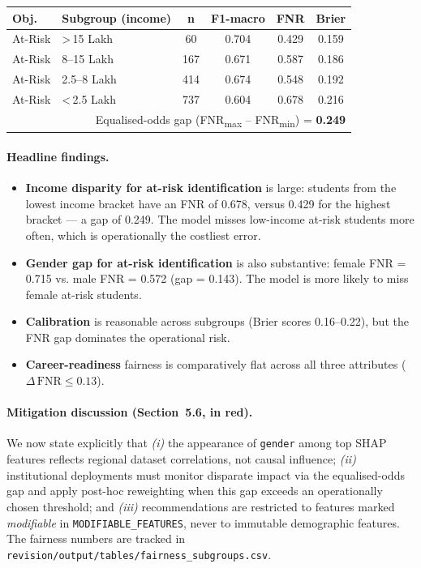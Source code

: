 \documentclass[11pt,a4paper]{article}
\newcommand{\filebox}[1]{\texttt{\small #1}}
\newcommand{\sectref}[1]{Section~#1}
\newcommand{\stress}[1]{\textbf{#1}}
\begin{document}
\begin{itemize}
\begin{center}\small
\begin{tabular}{l l c c c c}
\toprule
\textbf{Obj.} & \textbf{Subgroup (income)} & \textbf{n} & \textbf{F1-macro} & \textbf{FNR} & \textbf{Brier} \\
\midrule
At-Risk & \textgreater{}\,15 Lakh         & 60  & 0.704 & 0.429 & 0.159 \\
At-Risk & 8--15 Lakh                       & 167 & 0.671 & 0.587 & 0.186 \\
At-Risk & 2.5--8 Lakh                      & 414 & 0.674 & 0.548 & 0.192 \\
At-Risk & \textless\,2.5 Lakh              & 737 & 0.604 & 0.678 & 0.216 \\
\midrule
\multicolumn{6}{r}{Equalised-odds gap (FNR\textsubscript{max} -- FNR\textsubscript{min}) = \stress{0.249}} \\
\bottomrule
\end{tabular}
\end{center}

\paragraph{Headline findings.}
\begin{itemize}
  \item \stress{Income disparity for at-risk identification} is large: students from the lowest income bracket have an FNR of 0.678, versus 0.429 for the highest bracket --- a gap of 0.249. The model misses low-income at-risk students more often, which is operationally the costliest error.
  \item \stress{Gender gap for at-risk identification} is also substantive: female FNR = 0.715 vs. male FNR = 0.572 (gap = 0.143). The model is more likely to miss female at-risk students.
  \item \stress{Calibration} is reasonable across subgroups (Brier scores 0.16--0.22), but the FNR gap dominates the operational risk.
  \item \stress{Career-readiness} fairness is comparatively flat across all three attributes ($\Delta\,\text{FNR} \leq 0.13$).
\end{itemize}

\paragraph{Mitigation discussion (\sectref{5.6}, in red).} We now state explicitly that \emph{(i)} the appearance of \texttt{gender} among top SHAP features reflects regional dataset correlations, not causal influence; \emph{(ii)} institutional deployments must monitor disparate impact via the equalised-odds gap and apply post-hoc reweighting when this gap exceeds an operationally chosen threshold; and \emph{(iii)} recommendations are restricted to features marked \emph{modifiable} in \texttt{MODIFIABLE\_FEATURES}, never to immutable demographic features. The fairness numbers are tracked in \filebox{revision/output/tables/fairness\_subgroups.csv}.


\end{itemize}
\end{document}
